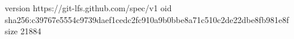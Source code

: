 version https://git-lfs.github.com/spec/v1
oid sha256:c39767e5554c9739daef1cedc2fc910a9b0bbe8a71c510c2de22dbe8fb981e8f
size 21884
